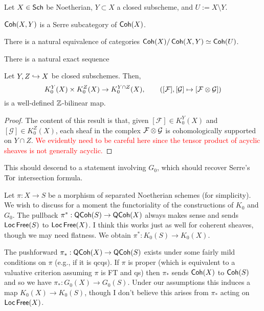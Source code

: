 \documentclass[11pt]{article}
\newcommand{\FF}{\mathcal{F}}
\newcommand{\GG}{\mathcal{G}}
\begin{document}
\begin{theorem}
Let $X\in\operatorname{\mathsf{Sch}}$ be Noetherian, $Y\subset X$ a closed subscheme, and $U:=X\setminus Y$. 
\begin{enum}{\alph}
\item $\operatorname{\mathsf{Coh}}(X,Y)$ is a Serre subcategory of $\operatorname{\mathsf{Coh}}(X)$.

\item There is a natural equivalence of categories $\operatorname{\mathsf{Coh}}(X)/\operatorname{\mathsf{Coh}}(X,Y)\simeq\operatorname{\mathsf{Coh}}(U)$.

\item There is a natural exact sequence
\begin{center}
\end{center}
\end{enum}
\end{theorem}

\begin{lemma}
Let $Y,Z\hookrightarrow X$ be closed subschemes. Then,
$$K_0^Y(X)\times K_0^Z(X)\to K_0^{Y\cap Z}(X),\qquad ([\FF],[\GG]\mapsto[\FF\tensor\GG])$$
is a well-defined $\mathbb{Z}$-bilinear map.
\end{lemma}

\begin{proof}
The content of this result is that, given $[\FF]\in K_0^Y(X)$ and $[\GG]\in K_0^Z(X)$, each sheaf in the complex $\FF\tensor\GG$ is cohomologically supported on $Y\cap Z$. \textcolor{red}{We evidently need to be careful here since the tensor product of acyclic sheaves is not generally acyclic.}
\end{proof}

\begin{remark}
This should descend to a statement involving $G_0$, which should recover Serre's $\operatorname{Tor}$ intersection formula.
\end{remark}

Let $\pi: X\to S$ be a morphism of separated Noetherian schemes (for simplicity). We wish to discuss for a moment the functoriality of the constructions of $K_0$ and $G_0$. The pullback $\pi^*: \operatorname{\mathsf{QCoh}}(S)\to\operatorname{\mathsf{QCoh}}(X)$ always makes sense and sends $\operatorname{\mathsf{Loc}}\operatorname{\mathsf{Free}}(S)$ to $\operatorname{\mathsf{Loc}}\operatorname{\mathsf{Free}}(X)$. I think this works just as well for coherent sheaves, though we may need flatness. We obtain $\pi^*: K_0(S)\to K_0(X)$.

The pushforward $\pi_*: \operatorname{\mathsf{QCoh}}(X)\to\operatorname{\mathsf{QCoh}}(S)$ exists under some fairly mild conditions on $\pi$ (e.g., if it is qcqs). If $\pi$ is proper (which is equivalent to a valuative criterion assuming $\pi$ is FT and qs) then $\pi_*$ sends $\operatorname{\mathsf{Coh}}(X)$ to $\operatorname{\mathsf{Coh}}(S)$ and so we have $\pi_*: G_0(X)\to G_0(S)$. Under our assumptions this induces a map $K_0(X)\to K_0(S)$, though I don't believe this arises from $\pi_*$ acting on $\operatorname{\mathsf{Loc}}\operatorname{\mathsf{Free}}(X)$.
\end{document}
